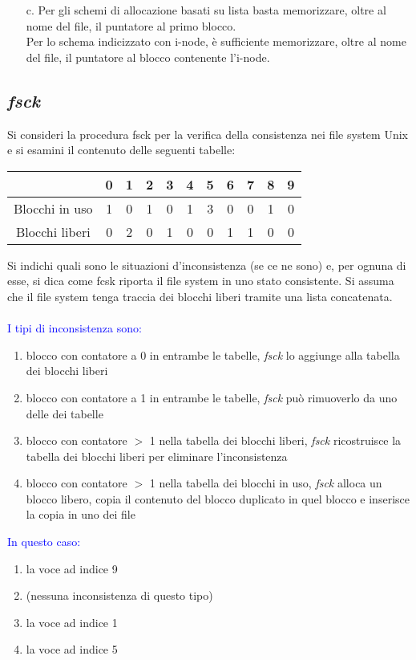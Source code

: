 \documentclass[12pt]{article}
\begin{document}
\begin{itemize}
    \color{blue}
    \item [c.] Per gli schemi di allocazione basati su lista basta memorizzare, oltre al nome del file, il puntatore al 
    primo blocco.\\
    Per lo schema indicizzato con i-node, è sufficiente memorizzare, oltre al nome del file, il puntatore al blocco contenente 
    l'i-node.
\end{itemize}
\subsection{\textit{fsck}}
Si consideri la procedura fsck per la verifica della consistenza nei file system Unix e si esamini il contenuto delle 
seguenti tabelle:\\
\begin{center}
    \begin{tabular}{c c|c|c|c|c|c|c|c|c|c }
        & 0 & 1 & 2 & 3 & 4 & 5 & 6 & 7 & 8 & 9 \\
       \hline
       Blocchi in uso & 1 & 0 & 1 & 0 & 1 & 3 & 0 & 0 & 1 & 0 \\
       \hline
       Blocchi liberi & 0 & 2 & 0 & 1 & 0 & 0 & 1 & 1 & 0 & 0 \\
       \hline
   \end{tabular}
\end{center}
Si indichi quali sono le situazioni d'inconsistenza (se ce ne sono) e, per ognuna di esse, si dica come
fcsk riporta il file system in uno stato consistente.
Si assuma che il file system tenga traccia dei blocchi liberi tramite una lista concatenata.\\\\
\textcolor{blue}{I tipi di inconsistenza sono:}
\begin{enumerate}
    \color{blue}
    \item blocco con contatore a 0 in entrambe le tabelle, \textit{fsck} lo aggiunge alla tabella dei blocchi liberi
    \item blocco con contatore a 1 in entrambe le tabelle, \textit{fsck} può rimuoverlo da uno delle dei tabelle
    \item blocco con contatore $>$ 1 nella tabella dei blocchi liberi, \textit{fsck} ricostruisce la tabella dei blocchi
    liberi per eliminare l'inconsistenza
    \item blocco con contatore $>$ 1 nella tabella dei blocchi in uso, \textit{fsck} alloca un blocco libero, copia il
    contenuto del blocco duplicato in quel blocco e inserisce la copia in uno dei file
\end{enumerate}
\textcolor{blue}{In questo caso:} 
\begin{enumerate}
    \color{blue}
    \item la voce ad indice 9
    \item (nessuna inconsistenza di questo tipo)
    \item la voce ad indice 1
    \item la voce ad indice 5
\end{enumerate}
\end{document}
